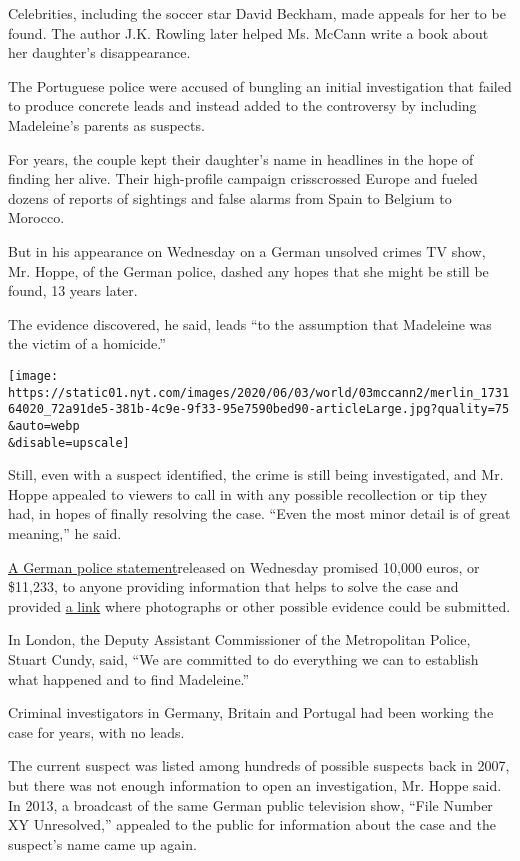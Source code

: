 Celebrities, including the soccer star David Beckham, made appeals for
her to be found. The author J.K. Rowling later helped Ms. McCann write a
book about her daughter's disappearance.

The Portuguese police were accused of bungling an initial investigation
that failed to produce concrete leads and instead added to the
controversy by including Madeleine's parents as suspects.

For years, the couple kept their daughter's name in headlines in the
hope of finding her alive. Their high-profile campaign crisscrossed
Europe and fueled dozens of reports of sightings and false alarms from
Spain to Belgium to Morocco.

But in his appearance on Wednesday on a German unsolved crimes TV show,
Mr. Hoppe, of the German police, dashed any hopes that she might be
still be found, 13 years later.

The evidence discovered, he said, leads ``to the assumption that
Madeleine was the victim of a homicide.''

\texttt{[image: https://static01.nyt.com/images/2020/06/03/world/03mccann2/merlin\_173164020\_72a91de5-381b-4c9e-9f33-95e7590bed90-articleLarge.jpg?quality=75\\\&auto=webp\\\&disable=upscale]}

Still, even with a suspect identified, the crime is still being
investigated, and Mr. Hoppe appealed to viewers to call in with any
possible recollection or tip they had, in hopes of finally resolving the
case. ``Even the most minor detail is of great meaning,'' he said.

\href{https://www.bka.de/DE/IhreSicherheit/Fahndungen/Personen/BekanntePersonen/43_Jaehriger_Deutscher_TV/Sachverhalt.html?nn=26874\#detailinformationen132470}{A
German police statement}released on Wednesday promised 10,000 euros, or
\$11,233, to anyone providing information that helps to solve the case
and provided \href{https://bka.hinweisportal.de/~portal/de/select}{a
link} where photographs or other possible evidence could be submitted.

In London, the Deputy Assistant Commissioner of the Metropolitan Police,
Stuart Cundy, said, ``We are committed to do everything we can to
establish what happened and to find Madeleine.''

Criminal investigators in Germany, Britain and Portugal had been working
the case for years, with no leads.

The current suspect was listed among hundreds of possible suspects back
in 2007, but there was not enough information to open an investigation,
Mr. Hoppe said. In 2013, a broadcast of the same German public
television show, ``File Number XY Unresolved,'' appealed to the public
for information about the case and the suspect's name came up again.


